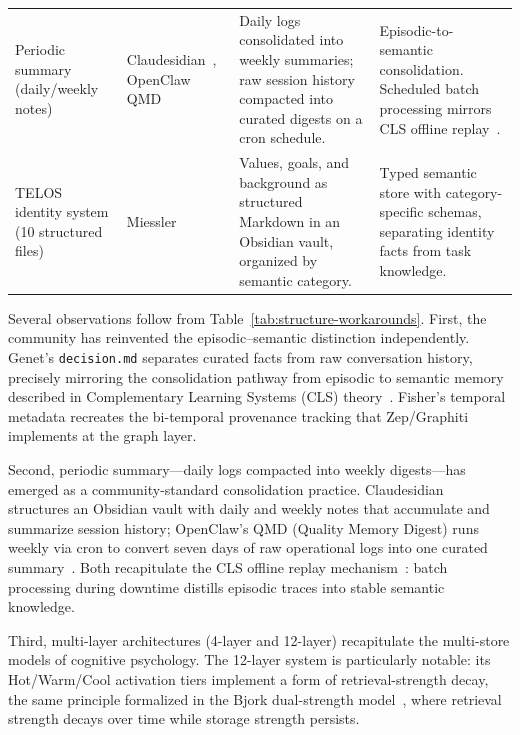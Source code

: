 \begin{table}[!t]
\begin{tabular}{@{}L{3.2cm}L{2.3cm}L{3.9cm}L{4.0cm}@{}}
\addlinespace
Periodic summary (daily/weekly notes)
  & Claudesidian~\cite{claudesidian2025}, OpenClaw QMD~\cite{casanova2026}
  & Daily logs consolidated into weekly summaries; raw session history
    compacted into curated digests on a cron schedule.
  & Episodic-to-semantic consolidation.  Scheduled batch processing
    mirrors CLS offline replay~\cite{mcclelland1995}. \\
\addlinespace
TELOS identity system (10 structured files)
  & Miessler~\cite{miessler2024telos}
  & Values, goals, and background as structured Markdown in an
    Obsidian vault, organized by semantic category.
  & Typed semantic store with category-specific schemas, separating
    identity facts from task knowledge. \\
\bottomrule
\end{tabular}
\end{table}

Several observations follow from Table~\ref{tab:structure-workarounds}.
First, the community has reinvented the episodic--semantic distinction
independently.  Genet's \texttt{decision.md} separates curated facts
from raw conversation history, precisely mirroring the consolidation
pathway from episodic to semantic memory described in Complementary
Learning Systems (CLS) theory~\cite{mcclelland1995}.  Fisher's temporal
metadata recreates the bi-temporal provenance tracking that
Zep/Graphiti~\cite{dempsey2025graphiti} implements at the graph layer.

Second, periodic summary---daily logs compacted into weekly
digests---has emerged as a community-standard consolidation practice.
Claudesidian~\cite{claudesidian2025} structures an Obsidian vault with
daily and weekly notes that accumulate and summarize session history;
OpenClaw's QMD (Quality Memory Digest) runs weekly via cron to convert
seven days of raw operational logs into one curated
summary~\cite{casanova2026}.  Both recapitulate the CLS offline replay
mechanism~\cite{mcclelland1995}: batch processing during downtime
distills episodic traces into stable semantic knowledge.

Third, multi-layer architectures (4-layer and 12-layer) recapitulate
the multi-store models of cognitive psychology.  The 12-layer system is
particularly notable: its Hot/Warm/Cool activation tiers implement a
form of retrieval-strength decay, the same principle formalized in the
Bjork dual-strength model~\cite{bjork1992}, where retrieval strength
decays over time while storage strength persists.

